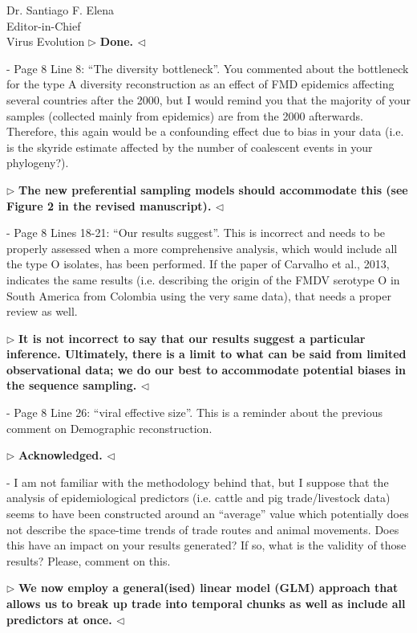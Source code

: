 \documentclass[12pt, a4paper]{letter} %
\newenvironment{reply}{$\triangleright$\bf}{$\triangleleft$}
\begin{document}
\begin{letter}{
	Dr. Santiago F. Elena\\
    Editor-in-Chief \\
    Virus Evolution
}
\begin{reply}
Done.
\end{reply}

-       Page 8 Line 8: ``The diversity bottleneck''. 
You commented about the bottleneck for the type A diversity reconstruction as an effect of FMD epidemics affecting several countries after the 2000, but I would remind you that the majority of your samples (collected mainly from epidemics) are from the 2000 afterwards. 
Therefore, this again would be a confounding effect due to bias in your data (i.e. is the skyride estimate affected by the number of coalescent events in your phylogeny?).

\begin{reply}
The new preferential sampling models should accommodate this (see Figure 2 in the revised manuscript).
\end{reply}

-       Page 8 Lines 18-21: ``Our results suggest''. 
This is incorrect and needs to be properly assessed when a more comprehensive analysis, which would include all the type O isolates, has been performed. 
If the paper of Carvalho et al., 2013, indicates the same results (i.e. describing the origin of the FMDV serotype O in South America from Colombia using the very same data), that needs a proper review as well.

\begin{reply}
It is not incorrect to say that our results suggest a particular inference.
Ultimately, there is a limit to what can be said from limited observational data; we do our best to accommodate potential biases in the sequence sampling.
\end{reply}

-       Page 8 Line 26: ``viral effective size''. 
This is a reminder about the previous comment on Demographic reconstruction.

\begin{reply}
Acknowledged.
\end{reply}

-       I am not familiar with the methodology behind that, but I suppose that the analysis of epidemiological predictors (i.e. cattle and pig trade/livestock data) seems to have been constructed around an ``average'' value which potentially does not describe the space-time trends of trade routes and animal movements. 
Does this have an impact on your results generated? 
If so, what is the validity of those results? Please, comment on this.

\begin{reply}
We now employ a general(ised) linear model (GLM) approach that allows us to break up trade into temporal chunks as well as include all predictors at once. 
\end{reply}


\end{letter}
\end{document}
